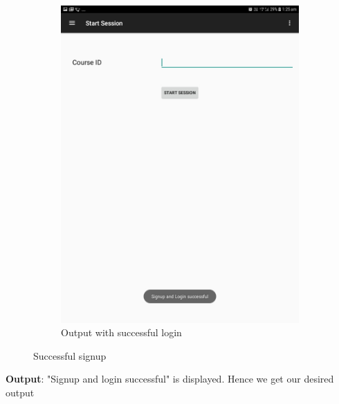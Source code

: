 \documentclass{scrreprt}
\begin{document}
\begin{itemize}
\begin{enumerate}
\begin{figure}[H]
\begin{subfigure}{0.5\textwidth}
\includegraphics[width=0.85\linewidth, keepaspectratio]{signupsucc.jpg}
\caption{Output with successful login}
\label{fig:subim2}
\end{subfigure}
\caption{Successful signup}
\end{figure}
\textbf{Output}: "Signup and login successful" is displayed. Hence we get our desired output
\end{enumerate}
\end{itemize}
\end{document}

